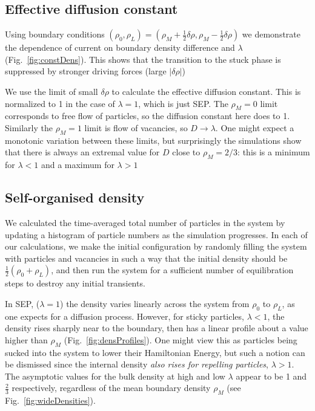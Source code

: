 \documentclass[
reprint, amsmath,amssymb,
]{revtex4-1}
\begin{document}
\subsection{Effective diffusion constant}


Using boundary conditions $(\rho_0, \rho_L) = (\rho_M + \frac{1}{2}
\delta\rho, \rho_M - \frac{1}{2} \delta\rho)$ we demonstrate the
dependence of current on boundary density difference and $\lambda$ (Fig.~\ref{fig:constDens}).  This
shows that the transition to the stuck phase is suppressed by stronger
driving forces (large $|\delta\rho|$)

We use the limit of small $\delta\rho$ to calculate the effective
diffusion constant.  This is normalized to 1 in the case of
$\lambda=1$, which is just SEP.  The $\rho_M=0$ limit corresponds to
free flow of particles, so the diffusion constant here does to
1. Similarly the $\rho_M=1$ limit is flow of vacancies, so
$D\rightarrow\lambda$.  One might expect a monotonic variation between
these limits, but surprisingly the simulations show that there is
always an extremal value for $D$ close to $\rho_M=2/3$: this is a
minimum for $\lambda<1$ and a maximum for $\lambda>1$


\subsection{Self-organised density}


We calculated the time-averaged total number of particles in
the system by updating a histogram of particle numbers
as the simulation progresses. In each of our calculations, we make the
initial configuration by randomly filling the system with particles
and vacancies in such a way that the initial density should be
$\frac{1}{2}(\rho_0 + \rho_L)$, and then run the system for a
sufficient number of equilibration steps to destroy any initial
transients.

In SEP, ($\lambda=1$) the density varies linearly across the system
from $\rho_0$ to $\rho_L$, as one expects for a diffusion process.
However, for sticky particles, $\lambda<1$, the density rises sharply
near to the boundary, then has a linear profile about a value higher
than $\rho_M$  (Fig.~\ref{fig:densProfiles}). 
One might view this as particles being sucked into the
system to lower their Hamiltonian Energy, but such a notion can be
dismissed since the internal density {\it also rises for repelling
  particles}, $\lambda>1$.  The asymptotic values for the bulk density at
high and low $\lambda$ appear to be 1 and $\frac{2}{3}$ respectively, regardless of the 
mean boundary density $\rho_M$ (see Fig.~\ref{fig:wideDensities}). 
\end{document}
